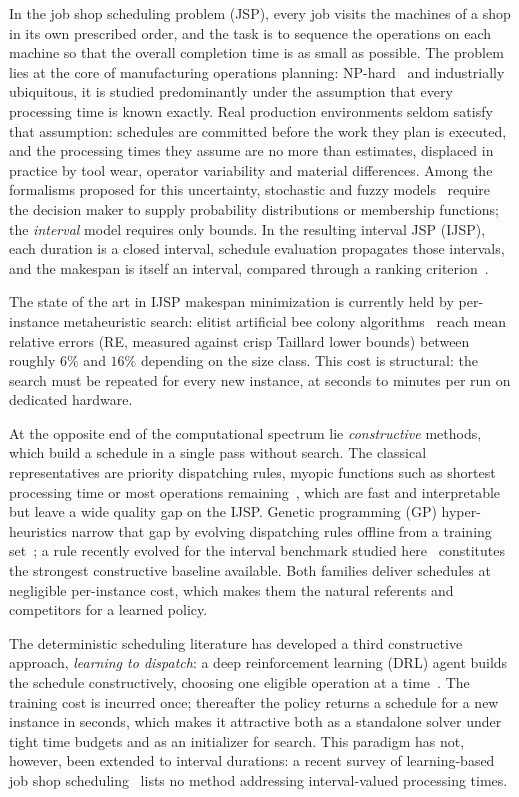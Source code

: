 \documentclass[preprint,authoryear,12pt]{elsarticle}
\theoremstyle{definition}
\theoremstyle{remark}
\begin{document}
In the job shop scheduling problem (JSP), every job visits the
machines of a shop in its own prescribed order, and the task is to
sequence the operations on each machine so that the overall
completion time is as small as possible. The
problem lies at the core of manufacturing operations planning:
NP-hard~\citep{GareyJohnson1976}
and industrially ubiquitous, it is studied predominantly under the
assumption that every processing time is known exactly. Real
production environments seldom satisfy that assumption: schedules are
committed before the work they plan is executed, and the processing
times they assume are no more than estimates, displaced in practice
by tool wear, operator variability and material differences. Among
the formalisms proposed for this uncertainty, stochastic and fuzzy
models~\citep{GonzalezRodriguez2010} require the decision maker to
supply probability distributions or membership functions; the
\emph{interval} model requires only bounds. In the resulting
interval JSP (IJSP), each duration is a closed interval, schedule
evaluation propagates those intervals, and the makespan is itself an
interval, compared through a ranking criterion~\citep{Lei2011,
DiazICAE2023}.

The state of the art in IJSP makespan minimization is currently
held by per-instance metaheuristic search: elitist artificial bee colony
algorithms~\citep{DiazFEABC2023,DiazICAE2023} reach mean relative
errors (RE, measured against crisp Taillard lower bounds) between
roughly $6\%$ and $16\%$ depending on the size class. This cost is structural: the search must
be repeated for every new instance, at seconds to minutes per run on
dedicated hardware.

At the opposite end of the computational spectrum lie
\emph{constructive} methods, which build a schedule in a single pass
without search. The classical representatives are priority dispatching
rules, myopic functions such as shortest processing time or most
operations remaining~\citep{Panwalkar1977,Haupt1989}, which are fast
and interpretable but leave a wide quality gap on the IJSP. Genetic
programming (GP) hyper-heuristics narrow that gap by evolving
dispatching rules offline from a training
set~\citep{Branke2016,Nguyen2017}; a rule recently evolved for the
interval benchmark studied here~\citep{DiazGP2026} constitutes the
strongest constructive baseline available. Both families deliver
schedules at negligible per-instance cost, which makes them the
natural referents and competitors for a learned policy.

The deterministic scheduling literature has developed a third
constructive approach, \emph{learning to dispatch}: a deep
reinforcement learning (DRL) agent builds the schedule constructively,
choosing one eligible operation at a
time~\citep{Zhang2020L2D,Park2021GNN,Tassel2021}. The
training cost is incurred once; thereafter the policy returns a
schedule for a new instance in seconds, which makes it attractive both
as a standalone solver under tight time budgets and as an initializer
for search. This paradigm has not, however, been extended to interval
durations: a recent survey of
learning-based job shop scheduling~\citep{Xu2025} lists no method
addressing interval-valued processing times.
\end{document}
